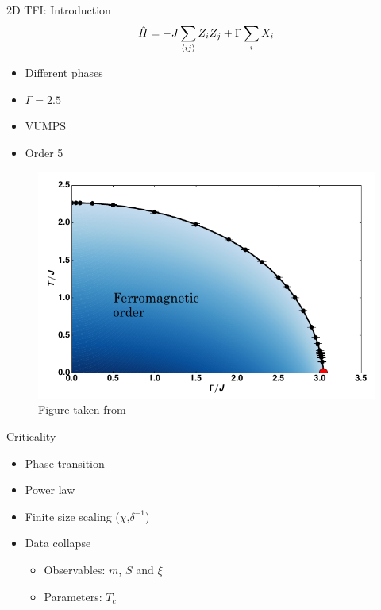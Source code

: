 \begin{frame}{2D TFI: Introduction}
    \begin{equation}
        \hat{H} = -J \sum_{  \Braket{ij }  } Z_i Z_j + \Gamma \sum_i X_i
    \end{equation}
    \begin{minipage}{0.35\textwidth}
        \begin{itemize}
            \item Different phases
            \item $\Gamma=2.5$
            \item VUMPS
            \item Order 5
        \end{itemize}
    \end{minipage}
    \begin{minipage}{0.64\textwidth}
        \begin{figure}
            \centering
            \includegraphics[width=\linewidth]{../Figuren/phsyics/2disingphase.png}
            \caption*{Figure taken from \cite{Hesselmann2016}  }
        \end{figure}
    \end{minipage}
\end{frame}

\begin{frame}{Criticality}
    \begin{itemize}
        \item Phase transition
        \item Power law
        \item Finite size scaling ($\chi$,$\delta^{-1}$)
        \item Data collapse
              \begin{itemize}
                  \item Observables:
                        $m$, $S$ and $\xi$
                  \item Parameters:
                        $T_c$
              \end{itemize}
    \end{itemize}
\end{frame}

